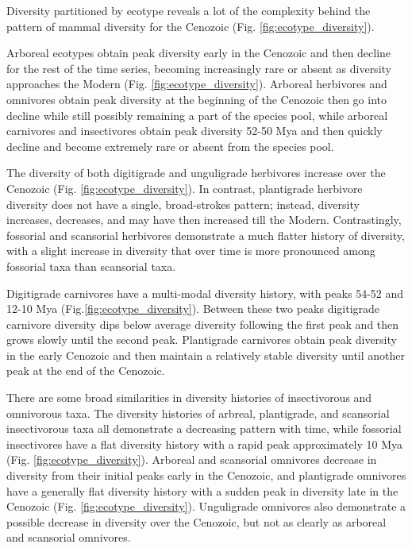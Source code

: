\documentclass[12pt,letterpaper]{article}
\begin{document}
Diversity partitioned by ecotype reveals a lot of the complexity behind the pattern of mammal diversity for the Cenozoic (Fig. \ref{fig:ecotype_diversity}). 

Arboreal ecotypes obtain peak diversity early in the Cenozoic and then decline for the rest of the time series, becoming increasingly rare or absent as diversity approaches the Modern (Fig. \ref{fig:ecotype_diversity}). Arboreal herbivores and omnivores obtain peak diversity at the beginning of the Cenozoic then go into decline while still possibly remaining a part of the species pool, while arboreal carnivores and insectivores obtain peak diversity 52-50 Mya and then quickly decline and become extremely rare or absent from the species pool.

The diversity of both digitigrade and unguligrade herbivores increase over the Cenozoic (Fig. \ref{fig:ecotype_diversity}). In contrast, plantigrade herbivore diversity does not have a single, broad-strokes pattern; instead, diversity increases, decreases, and may have then increased till the Modern. Contrastingly, fossorial and scansorial herbivores demonstrate a much flatter history of diversity, with a slight increase in diversity that over time is more pronounced among fossorial taxa than scansorial taxa.

Digitigrade carnivores have a multi-modal diversity history, with peaks 54-52 and 12-10 Mya (Fig.\ref{fig:ecotype_diversity}). Between these two peaks digitigrade carnivore diversity dips below average diversity following the first peak and then grows slowly until the second peak. Plantigrade carnivores obtain peak diversity in the early Cenozoic and then maintain a relatively stable diversity until another peak at the end of the Cenozoic.

There are some broad similarities in diversity histories of insectivorous and omnivorous taxa. The diversity histories of arbreal, plantigrade, and scansorial insectivorous taxa all demonstrate a decreasing pattern with time, while fossorial insectivores have a flat diversity history with a rapid peak approximately 10 Mya (Fig. \ref{fig:ecotype_diversity}). Arboreal and scansorial omnivores decrease in diversity from their initial peaks early in the Cenozoic, and plantigrade omnivores have a generally flat diversity history with a sudden peak in diversity late in the Cenozoic (Fig. \ref{fig:ecotype_diversity}). Unguligrade omnivores also demonstrate a possible decrease in diversity over the Cenozoic, but not as clearly as arboreal and scansorial omnivores.
\end{document}

